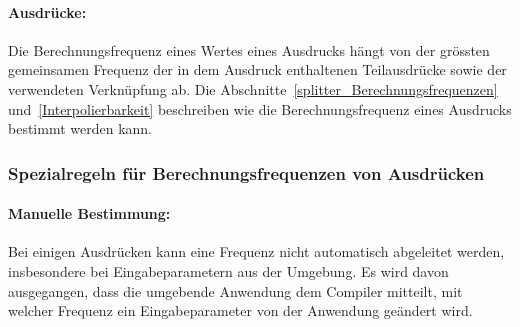 \paragraph{Ausdrücke:} Die Berechnungsfrequenz eines Wertes eines Ausdrucks hängt von der grössten gemeinsamen Frequenz
der in dem Ausdruck enthaltenen Teilausdrücke sowie der verwendeten Verknüpfung ab.
Die Abschnitte~\ref{splitter_Berechnungsfrequenzen} und~\ref{Interpolierbarkeit} beschreiben wie die Berechnungsfrequenz eines Ausdrucks bestimmt werden kann.

\subsubsection{Spezialregeln für Berechnungsfrequenzen von Ausdrücken}

\paragraph{Manuelle Bestimmung:}
Bei einigen Ausdrücken kann eine Frequenz nicht automatisch abgeleitet werden, insbesondere bei Eingabeparametern aus der
Umgebung. Es wird davon ausgegangen, dass die umgebende Anwendung dem Compiler mitteilt, mit welcher Frequenz ein Eingabeparameter
von der Anwendung geändert wird.\\


